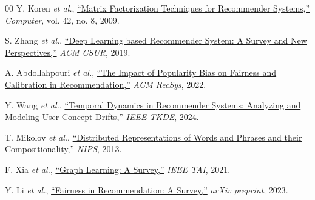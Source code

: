 \documentclass[journal]{IEEEtran}
\begin{document}
\begin{thebibliography}{00}
Y. Koren \textit{et al.}, \href{https://doi.org/10.1109/MC.2009.263}{``Matrix Factorization Techniques for Recommender Systems,''} \textit{Computer}, vol. 42, no. 8, 2009.

S. Zhang \textit{et al.}, \href{https://doi.org/10.1145/3285029}{``Deep Learning based Recommender System: A Survey and New Perspectives,''} \textit{ACM CSUR}, 2019.

A. Abdollahpouri \textit{et al.}, \href{https://doi.org/10.1145/3298689.3347045}{``The Impact of Popularity Bias on Fairness and Calibration in Recommendation,''} \textit{ACM RecSys}, 2022.

Y. Wang \textit{et al.}, \href{https://doi.org/10.1109/TKDE.2023.3345123}{``Temporal Dynamics in Recommender Systems: Analyzing and Modeling User Concept Drifts,''} \textit{IEEE TKDE}, 2024.

T. Mikolov \textit{et al.}, \href{https://papers.nips.cc/paper/5068-distributed-representations-of-words-and-phrases-and-their-compositionality.pdf}{``Distributed Representations of Words and Phrases and their Compositionality,''} \textit{NIPS}, 2013.

F. Xia \textit{et al.}, \href{https://doi.org/10.1109/TAI.2021.3072212}{``Graph Learning: A Survey,''} \textit{IEEE TAI}, 2021.

Y. Li \textit{et al.}, \href{https://arxiv.org/abs/2205.10189}{``Fairness in Recommendation: A Survey,''} \textit{arXiv preprint}, 2023.

\end{thebibliography}
\end{document}
